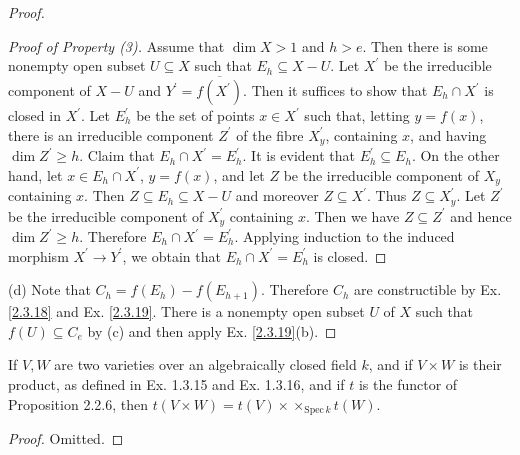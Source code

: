 \begin{proof}
\begin{proof}[Proof of Property (3)]
		Assume that $\dim X>1$ and $h>e$. Then there is some nonempty open subset $U\subseteq X$ such that $E_h\subseteq X-U$. Let $X^{\prime}$ be the irreducible component of $X-U$ and $Y^{\prime}=\overline{f(X^{\prime})}$. Then it suffices to show that $E_h\cap X^{\prime}$ is closed in $X^{\prime}$. Let $E_{h}^{\prime}$ be the set of points $x \in X^{\prime}$ such that, letting $y=f(x)$, there is an irreducible component $Z^{\prime}$ of the fibre $X^{\prime}_{y}$, containing $x$, and having $\dim Z^{\prime} \geq h$. Claim that $E_h\cap X^\prime=E_h^{\prime}$. It is evident that $E_h^{\prime}\subseteq E_h$. On the other hand, let $x\in E_h\cap X^{\prime}$, $y=f(x)$, and let $Z$ be the irreducible component of $X_y$ containing $x$. Then $Z\subseteq E_h\subseteq X-U$ and moreover $Z\subseteq X^{\prime}$. Thus $Z\subseteq X^{\prime}_y$. Let $Z^{\prime}$ be the irreducible component of $X^{\prime}_y$ containing $x$. Then we have $Z\subseteq Z^{\prime}$ and hence $\dim Z^{\prime}\geq h$. Therefore $E_h\cap X^{\prime}= E^{\prime}_h$. Applying induction to the induced morphism $X^{\prime}\to Y^{\prime}$, we obtain that $E_h\cap X^{\prime}=E_h^{\prime}$ is closed.
	\end{proof}
	(d) Note that $C_h=f(E_h)-f(E_{h+1})$. Therefore $C_h$ are constructible by Ex. \ref{2.3.18} and Ex. \ref{2.3.19}. There is a nonempty open subset $U$ of $X$ such that $f(U)\subseteq C_e$ by (c) and then apply Ex. \ref{2.3.19}(b). 
\end{proof}
\begin{exe}
	\label{2.3.23}
	If $V, W$ are two varieties over an algebraically closed field $k$, and if $V \times W$ is their product, as defined in Ex. 1.3.15 and Ex. 1.3.16, and if $t$ is the functor of Proposition 2.2.6, then $t(V \times W)=t(V) \times \times_{\mathrm{Spec}\,k} t(W)$.
\end{exe}
\begin{proof}
	Omitted.
\end{proof}